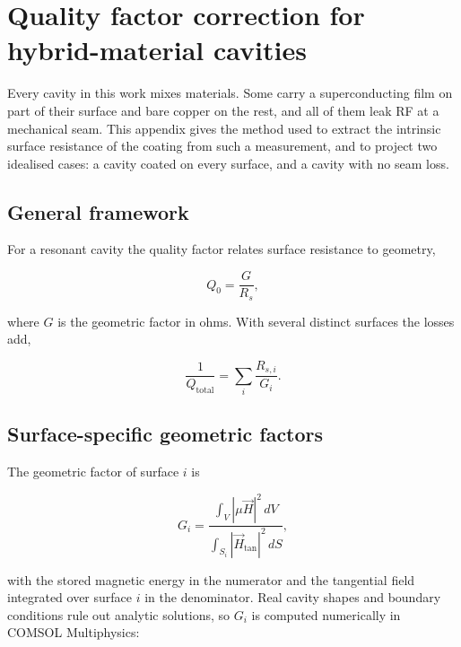 \section{Quality factor correction for hybrid-material cavities}\label{app:Qcorrection}

Every cavity in this work mixes materials. Some carry a superconducting film on part of their surface and bare copper on the rest, and all of them leak RF at a mechanical seam. This appendix gives the method used to extract the intrinsic surface resistance of the coating from such a measurement, and to project two idealised cases: a cavity coated on every surface, and a cavity with no seam loss.

\subsection{General framework}

For a resonant cavity the quality factor relates surface resistance to geometry,

\begin{equation}
Q_0 = \frac{G}{R_s},
\label{eq:Q_basic}
\end{equation}

where $G$ is the geometric factor in ohms. With several distinct surfaces the losses add,

\begin{equation}
\frac{1}{Q_\text{total}} = \sum_{i} \frac{R_{s,i}}{G_i}.
\label{eq:Q_multisurf}
\end{equation}

\subsection{Surface-specific geometric factors}

The geometric factor of surface $i$ is

\begin{equation}
G_i = \frac{\int_V |\mu \vec{H}|^2\, dV}{\int_{S_i} |\vec{H}_\text{tan}|^2\, dS},
\label{eq:G_definition}
\end{equation}

with the stored magnetic energy in the numerator and the tangential field integrated over surface $i$ in the denominator. Real cavity shapes and boundary conditions rule out analytic solutions, so $G_i$ is computed numerically in COMSOL Multiphysics:

